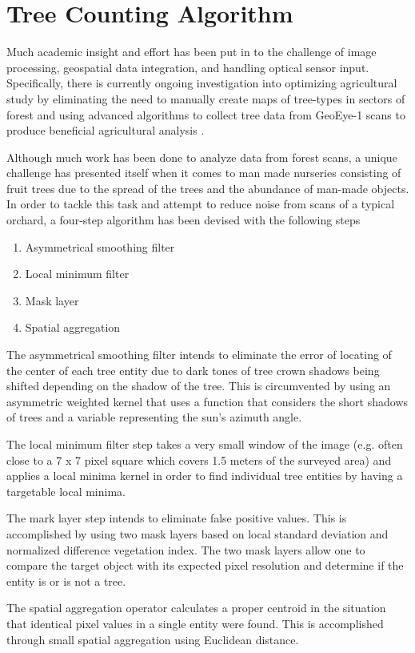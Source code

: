 \documentclass[]{article}
\begin{document}
\section{Tree Counting Algorithm}
Much academic insight and effort has been put in to the challenge of image processing, geospatial data integration, and handling optical sensor input.  Specifically, there is currently ongoing investigation into optimizing agricultural study by eliminating the need to manually create maps of tree-types in sectors of forest and using advanced algorithms to collect tree data from GeoEye-1 scans to produce beneficial agricultural analysis \cite[Santoro 2013]{santoro2013tree}.

Although much work has been done to analyze data from forest scans, a unique challenge has presented itself when it comes to man made nurseries consisting of fruit trees due to the spread of the trees and the abundance of man-made objects. In order to tackle this task and attempt to reduce noise from scans of a typical orchard, a four-step algorithm has been devised with the following steps
\begin{enumerate}
	\item Asymmetrical smoothing filter
	\item Local minimum filter
	\item Mask layer
	\item Spatial aggregation
\end{enumerate}
The asymmetrical smoothing filter intends to eliminate the error of locating of the center of each tree entity due to dark tones of tree crown shadows being shifted depending on the shadow of the tree.  This is circumvented by using an asymmetric weighted kernel that uses a function that considers the short shadows of trees and a variable representing the sun's azimuth angle.

The local minimum filter step takes a very small window of the image (e.g. often close to a 7 x 7 pixel square which covers 1.5 meters of the surveyed area) and applies a local minima kernel in order to find individual tree entities by having a targetable local minima.

The mark layer step intends to eliminate false positive values.  This is accomplished by using two mask layers based on local standard deviation and normalized difference vegetation index.  The two mask layers allow one to compare the target object with its expected pixel resolution and determine if the entity is or is not a tree.

The spatial aggregation operator calculates a proper centroid in the situation that identical pixel values in a single entity were found.  This is accomplished through small spatial aggregation using Euclidean distance.
\end{document}
